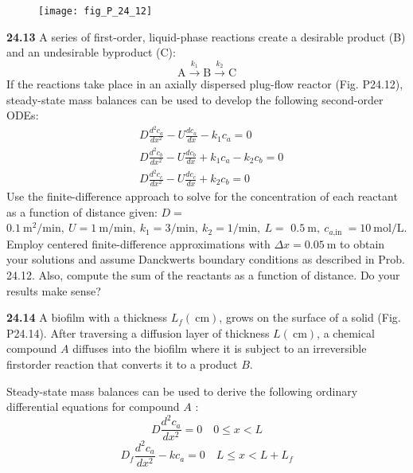 \documentclass[../main.tex]{subfiles}
\begin{document}
\begin{multicols}{2}
    \begin{figure}[H]
        \centering
        \texttt{[image: fig\_P\_24\_12]}
        \caption{}
       \label{fig:fig_P_24_12} %
    \end{figure}\vspace{2mm}

    \noindent\textbf{24.13} A series of first-order, liquid-phase reactions create a desirable product (B) and an undesirable byproduct (C):
    $$
    \mathrm{A} \stackrel{k_{1}}{\rightarrow} \mathrm{B} \stackrel{k_{2}}{\rightarrow} \mathrm{C}
    $$
    If the reactions take place in an axially dispersed plug-flow reactor (Fig. P24.12), steady-state mass balances can be used to develop the following second-order ODEs:
    $$
    \begin{aligned}
    &D \frac{d^{2} c_{a}}{d x^{2}}-U \frac{d c_{a}}{d x}-k_{1} c_{a}=0 \\
    &D \frac{d^{2} c_{b}}{d x^{2}}-U \frac{d c_{b}}{d x}+k_{1} c_{a}-k_{2} c_{b}=0 \\
    &D \frac{d^{2} c_{c}}{d x^{2}}-U \frac{d c_{c}}{d x}+k_{2} c_{b}=0
    \end{aligned}
    $$
    Use the finite-difference approach to solve for the concentration of each reactant as a function of distance given: $D=$ $0.1 \mathrm{~m}^{2} / \mathrm{min},\ U=1 \mathrm{~m} / \mathrm{min},\ k_{1}=3 / \mathrm{min},\ k_{2}=1 / \mathrm{min},\ L=$ $0.5 \mathrm{~m},\ c_{a \text {,in }}=10 \mathrm{~mol} / \mathrm{L}$.
    Employ centered finite-difference approximations with $\Delta x=0.05 \mathrm{~m}$ to obtain your solutions and assume Danckwerts boundary conditions as described in Prob. 24.12. Also, compute the sum of the reactants as a function of distance. Do your results make sense?\vspace{2mm}

    \noindent\textbf{24.14} A biofilm with a thickness $L_{f}(\mathrm{~cm})$, grows on the surface of a solid (Fig. P24.14). After traversing a diffusion layer of thickness $L(\mathrm{~cm})$, a chemical compound $A$ diffuses into the biofilm where it is subject to an irreversible firstorder reaction that converts it to a product $B$.

    Steady-state mass balances can be used to derive the following ordinary differential equations for compound $A$ :
    \begin{equation} \nonumber
        D \frac{d^{2} c_{a}}{d x^{2}}=0 \quad 0 \leq x<L
    \end{equation}\vspace*{\smallskipamount} 
    \begin{equation}\nonumber
        D_{f} \frac{d^{2} c_{a}}{d x^{2}}-k c_{a}=0 \quad L \leq x<L+L_{f}
    \end{equation}


\end{multicols}
\end{document}
